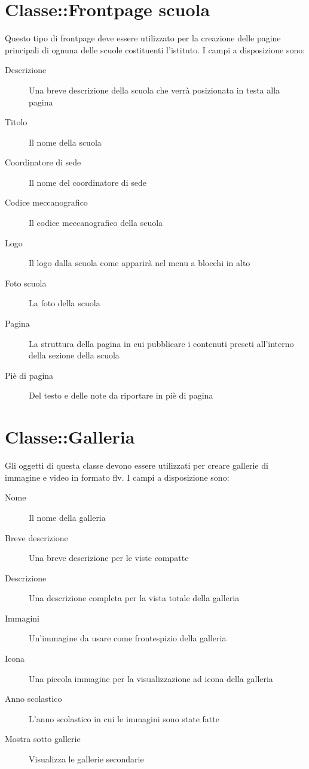 \section{Classe::Frontpage scuola}
Questo tipo di frontpage deve essere utilizzato per la creazione delle pagine principali di ognuna delle scuole costituenti l'istituto. I campi a disposizione sono:
\begin{description}
\item[Descrizione] Una breve descrizione della scuola che verrà posizionata in testa alla pagina
\item[Titolo]Il nome della scuola
\item[Coordinatore di sede]Il nome del coordinatore di sede
\item[Codice meccanografico]Il codice meccanografico della scuola
\item[Logo]Il logo dalla scuola come apparirà nel menu a blocchi in alto 
\item[Foto scuola]La foto della scuola
\item[Pagina]La struttura della pagina in cui pubblicare i contenuti preseti all'interno della sezione della scuola
\item[Piè di pagina]Del testo e delle note da riportare in piè di pagina
\end{description}

\section{Classe::Galleria}
Gli oggetti di questa classe devono essere utilizzati per creare gallerie di immagine e video in formato flv. I campi a disposizione sono:
\begin{description}
 \item[Nome]Il nome della galleria
\item[Breve descrizione]Una breve descrizione per le viste compatte
\item[Descrizione]Una descrizione completa per la vista totale della galleria
\item[Immagini]Un'immagine da usare come frontespizio della galleria
\item[Icona]Una piccola immagine per la visualizzazione ad icona della galleria
\item[Anno scolastico]L'anno scolastico in cui le immagini sono state fatte
\item[Mostra sotto gallerie] Visualizza le gallerie secondarie
\end{description}


